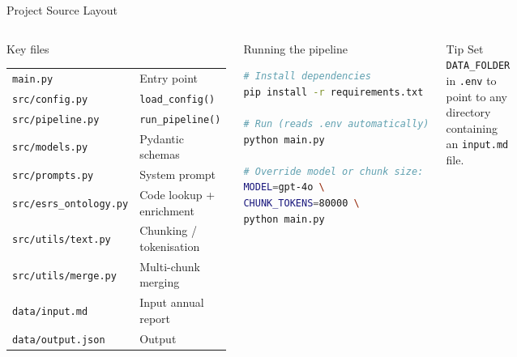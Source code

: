 \documentclass[aspectratio=169]{beamer}
\begin{document}
\begin{frame}[fragile,shrink=5]{Project Source Layout}
  \begin{columns}
      \begin{block}{Key files}
        \footnotesize
        \begin{tabular}{ll}
          \texttt{main.py}                  & Entry point \\
          \texttt{src/config.py}            & \texttt{load\_config()} \\
          \texttt{src/pipeline.py}          & \texttt{run\_pipeline()} \\
          \texttt{src/models.py}            & Pydantic schemas \\
          \texttt{src/prompts.py}           & System prompt \\
          \texttt{src/esrs\_ontology.py}    & Code lookup + enrichment \\
          \texttt{src/utils/text.py}        & Chunking / tokenisation \\
          \texttt{src/utils/merge.py}       & Multi-chunk merging \\
          \texttt{data/input.md}            & Input annual report \\
          \texttt{data/output.json}         & Output \\
        \end{tabular}
      \end{block}
      \begin{block}{Running the pipeline}
        \begin{lstlisting}[language=bash]
# Install dependencies
pip install -r requirements.txt

# Run (reads .env automatically)
python main.py

# Override model or chunk size:
MODEL=gpt-4o \
CHUNK_TOKENS=80000 \
python main.py
        \end{lstlisting}
      \end{block}
      \vspace{4pt}
      \begin{alertblock}{Tip}
        \footnotesize Set \texttt{DATA\_FOLDER} in \texttt{.env} to point to any directory
        containing an \texttt{input.md} file.
      \end{alertblock}
  \end{columns}
\end{frame}
\end{document}
